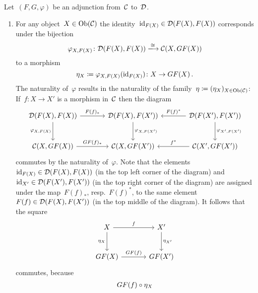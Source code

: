 \begin{remark}
  Let~$(F,G,\varphi)$ be an adjunction from~$\mathcal{C}$ to~$\mathcal{D}$.
  \begin{enumerate}
    \item
      For any object~$X \in \operatorname{Ob}(\mathcal{C})$ the identity~$\mathrm{id}_{F(X)} \in \mathcal{D}(F(X), F(X))$ corresponds under the bijection
      \[
                        \varphi_{X,F(X)}
        \colon          \Dcat(F(X), F(X))
        \xlongto{\cong} \Ccat(X, GF(X))
      \]
      to a morphism
      \[
                  \eta_X
        \coloneqq  \varphi_{X,F(X)}(\mathrm{id}_{F(X)})
        \colon    X
        \to       GF(X) \,.
      \]
      The naturality of~$\varphi$ results in the naturality of the family~$\eta \coloneqq (\eta_X)_{X \in \operatorname{Ob}(\mathcal{C})}$:
      If~$f \colon X \to X'$ is a morphism in~$\mathcal{C}$ then the diagram
      \begin{equation}
        \label{big diagram}
        \begin{tikzcd}[sep = large]
            \Dcat(F(X), F(X))
            \arrow{r}[above]{F(f)_*}
            \arrow{d}[left]{\varphi_{X,F(X)}}
          & \Dcat(F(X), F(X'))
            \arrow{d}{\varphi_{X,F(X')}}
          & \Dcat(F(X'), F(X'))
            \arrow{l}[above]{F(f)^*}
            \arrow{d}[right]{\varphi_{X',F(X')}}
          \\
            \Ccat(X, GF(X))
            \arrow{r}[above]{GF(f)_*}
          & \Ccat(X, GF(X'))
          & \Ccat(X', GF(X'))
            \arrow{l}[above]{f^*}
        \end{tikzcd}
      \end{equation}
      commutes by the naturality of~$\varphi$.
      Note that the elements~$\mathrm{id}_{F(X)} \in \mathcal{D}(F(X), F(X))$ (in the top left corner of the diagram) and~$\mathrm{id}_{X'} \in \mathcal{D}(F(X'), F(X'))$ (in the top right corner of the diagram) are assigned under the map~$F(f)_*$, resp.~$F(f)^*$, to the same element~$F(f) \in \mathcal{D}(F(X), F(X'))$ (in the top middle of the diagram).
      It follows that the square
      \[
        \begin{tikzcd}[sep = large]
            X
            \arrow{r}[above]{f}
            \arrow{d}[left]{\eta_X}
          & X'
            \arrow{d}[right]{\eta_{X'}}
          \\
            GF(X)
            \arrow{r}[above]{GF(f)}
          & GF(X')
        \end{tikzcd}
      \]
      commutes, because
      \begin{align}
         {}&  GF(f) \circ \eta_X  \notag  \\

\end{align}
\end{enumerate}
\end{remark}
